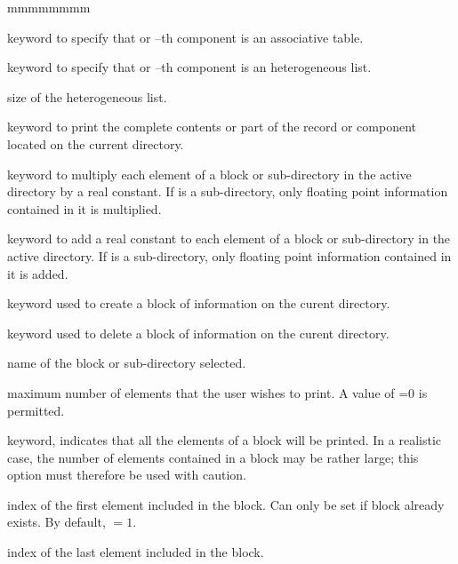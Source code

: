 \begin{ListeDeDescription}{mmmmmmmm}
\item[\moc{DICT}] keyword to specify that  or --th component is an associative table.

\item[\moc{LIST}] keyword to specify that  or --th component is an heterogeneous list.

\item[\dusa{nsize}] size of the heterogeneous list.

\item[\moc{IMPR}] keyword to print the complete contents or part of the record
 or component  located on the current directory.

\item[\moc{MULT}] keyword to multiply each element of a block or sub-directory
in the active directory by a real constant. If  is a
sub-directory, only floating point information contained in it is multiplied.

\item[\moc{SADD}] keyword to add a real constant to each element of a block or sub-directory in the
active directory. If  is a sub-directory, only floating point information contained in it is added.

\item[\moc{CREA}] keyword used to create a block of information on the
curent directory.

\item[\moc{DEL}] keyword used to delete a block of information on the
curent directory.

\item[\dusa{BLOCK}] name of the block or sub-directory selected.

\item[\dusa{ileni}] maximum number of elements that the user wishes to print.
A value of =0 is permitted.

\item[\moc{*}] keyword, indicates that all the elements of a block will be
printed. In a realistic case, the number of elements contained in a block may be
rather large; this option must therefore be used with caution.

\item[\dusa{ilenc1}] index of the first element included in the block. Can only be set if block
 already exists. By default,  $=1$.

\item[\dusa{ilenc2}] index of the last element included in the block.


\end{ListeDeDescription}
